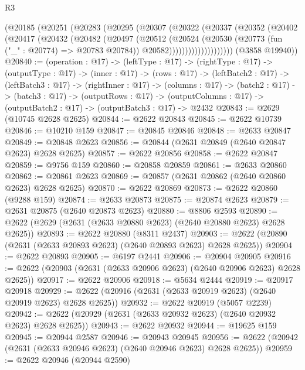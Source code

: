 \begin{lexlean}{R3}
\begin{coremodule}
              (@20185
                (@20251
                  (@20283
                    (@20295
                      (@20307
                        (@20322
                          (@20337
                            (@20352
                              (@20402
                                (@20417
                                  (@20432
                                    (@20482
                                      (@20497
                                        (@20512
                                          (@20524
                                            (@20530
                                              (@20773 (fun ("_" : @20774) => @20783 @20784))
                                              @20582))))))))))))))))))))
      (@3858 @19940))
@20840 := (operation : @17) ->
  (leftType : @17) ->
  (rightType : @17) ->
  (outputType : @17) ->
  (inner : @17) ->
  (rows : @17) ->
  (leftBatch2 : @17) ->
  (leftBatch3 : @17) ->
  (rightInner : @17) ->
  (columns : @17) ->
  (batch2 : @17) ->
  (batch3 : @17) ->
  (outputRows : @17) ->
  (outputColumns : @17) -> (outputBatch2 : @17) -> (outputBatch3 : @17) -> @2432
@20843 := @2629 (@10745 @2628 @2625)
@20844 := @2622 @20843
@20845 := @2622 @10739
@20846 := @10210 @159
@20847 := @20845 @20846
@20848 := @2633 @20847
@20849 := @20848 @2623
@20856 := @20844 (@2631 @20849 (@2640 @20847 @2623) @2628 @2625)
@20857 := @2622 @20856
@20858 := @2622 @20847
@20859 := @9756 @159
@20860 := @20858 @20859
@20861 := @2633 @20860
@20862 := @20861 @2623
@20869 := @20857 (@2631 @20862 (@2640 @20860 @2623) @2628 @2625)
@20870 := @2622 @20869
@20873 := @2622 @20860 (@9288 @159)
@20874 := @2633 @20873
@20875 := @20874 @2623
@20879 := @2631 @20875 (@2640 @20873 @2623)
@20880 := @8806 @2593
@20890 := @2622 (@2629 (@2631 (@2633 @20880 @2623) (@2640 @20880 @2623) @2628 @2625))
@20893 := @2622 @20880 (@8311 @2437)
@20903 := @2622 (@20890 (@2631 (@2633 @20893 @2623) (@2640 @20893 @2623) @2628 @2625))
@20904 := @2622 @20893
@20905 := @6197 @2441
@20906 := @20904 @20905
@20916 := @2622 (@20903 (@2631 (@2633 @20906 @2623) (@2640 @20906 @2623) @2628 @2625))
@20917 := @2622 @20906
@20918 := @5634 @2444
@20919 := @20917 @20918
@20929 := @2622 (@20916 (@2631 (@2633 @20919 @2623) (@2640 @20919 @2623) @2628 @2625))
@20932 := @2622 @20919 (@5057 @2239)
@20942 := @2622 (@20929 (@2631 (@2633 @20932 @2623) (@2640 @20932 @2623) @2628 @2625))
@20943 := @2622 @20932
@20944 := @19625 @159
@20945 := @20944 @2587
@20946 := @20943 @20945
@20956 := @2622 (@20942 (@2631 (@2633 @20946 @2623) (@2640 @20946 @2623) @2628 @2625))
@20959 := @2622 @20946 (@20944 @2590)

\end{coremodule}
\end{lexlean}

